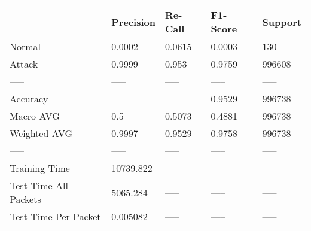 \begin{tabular}{lllll}
\toprule
{} &  Precision & Re-Call & F1-Score & Support \\
\midrule
Normal                &     0.0002 &  0.0615 &   0.0003 &     130 \\
Attack                &     0.9999 &   0.953 &   0.9759 &  996608 \\
-----                 &      ----- &   ----- &    ----- &   ----- \\
Accuracy              &            &         &   0.9529 &  996738 \\
Macro AVG             &        0.5 &  0.5073 &   0.4881 &  996738 \\
Weighted AVG          &     0.9997 &  0.9529 &   0.9758 &  996738 \\
-----                 &      ----- &   ----- &    ----- &   ----- \\
Training Time         &  10739.822 &   ----- &    ----- &   ----- \\
Test Time-All Packets &   5065.284 &   ----- &    ----- &   ----- \\
Test Time-Per Packet  &   0.005082 &   ----- &    ----- &   ----- \\
\bottomrule
\end{tabular}
